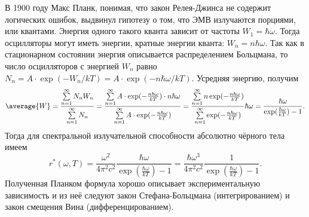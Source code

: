\documentclass{hedexams}
\begin{document}
В 1900 году Макс Планк, понимая, что закон Релея-Джинса не содержит логических
ошибок, выдвинул гипотезу о том, что ЭМВ излучаются порциями, или квантами.
Энергия одного такого кванта зависит от частоты \( W_1 = \hbar\omega \).
Тогда осцилляторы могут иметь энергии, кратные энергии кванта:
\( W_n = n\hbar\omega \). Так как в стационарном состоянии энергия описывается
распределением Больцмана, то число осцилляторов с энергией \( W_n \) равно
\( N_n = A\cdot\exp(-W_n/kT) = A\cdot\exp(-n\hbar\omega/kT) \). Усредняя
энергию, получим
\[
    \average{W} =
    \frac{\sum\limits_{n=1}^\infty N_nW_n}{\sum\limits_{n=1}^\infty N_n} =
    \frac{\sum\limits_{n=1}^\infty A\cdot\exp(-\frac{n\hbar\omega}{kT})\cdot
    n\hbar\omega}{\sum\limits_{n=1}^\infty A\cdot\exp(-\frac{n\hbar\omega}{kT})} =
    \frac{\sum\limits_{n=1}^\infty n\exp(-\frac{n\hbar\omega}{kT})}
    {\sum\limits_{n=1}^\infty \exp(-\frac{n\hbar\omega}{kT})}\hbar\omega =
    \frac{\hbar\omega}{\exp(\frac{\hbar\omega}{kT}) - 1}.
\]
Тогда для спектральной излучательной способности абсолютно чёрного тела имеем
\[
    r^*(\omega, T) = \frac{\omega^2}{4\pi^2c^2}
    \frac{\hbar\omega}{\exp(\frac{\hbar\omega}{kT}) - 1} = \frac{\hbar\omega^3}
    {4\pi^2c^2}\frac{1}{\exp(\frac{\hbar\omega}{kT}) - 1}.
\]
Полученная Планком формула хорошо описывает экспериментальную зависимость и из
неё следуют закон Стефана-Больцмана (интегрированием) и закон смещения Вина
(дифференцированием).
\end{document}
